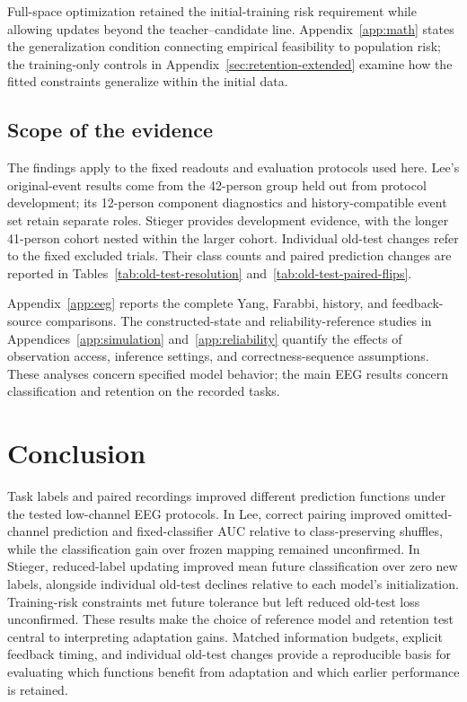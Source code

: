 \documentclass[11pt,a4paper]{article}
\begin{document}
Full-space optimization retained the initial-training risk requirement while allowing updates beyond the teacher--candidate line. Appendix~\ref{app:math} states the generalization condition connecting empirical feasibility to population risk; the training-only controls in Appendix~\ref{sec:retention-extended} examine how the fitted constraints generalize within the initial data.

\subsection{Scope of the evidence}

The findings apply to the fixed readouts and evaluation protocols used here. Lee's original-event results come from the 42-person group held out from protocol development; its 12-person component diagnostics and history-compatible event set retain separate roles. Stieger provides development evidence, with the longer 41-person cohort nested within the larger cohort. Individual old-test changes refer to the fixed excluded trials. Their class counts and paired prediction changes are reported in Tables~\ref{tab:old-test-resolution} and~\ref{tab:old-test-paired-flips}.

Appendix~\ref{app:eeg} reports the complete Yang, Farabbi, history, and feedback-source comparisons. The constructed-state and reliability-reference studies in Appendices~\ref{app:simulation} and~\ref{app:reliability} quantify the effects of observation access, inference settings, and correctness-sequence assumptions. These analyses concern specified model behavior; the main EEG results concern classification and retention on the recorded tasks.

\section{Conclusion}

Task labels and paired recordings improved different prediction functions under the tested low-channel EEG protocols. In Lee, correct pairing improved omitted-channel prediction and fixed-classifier AUC relative to class-preserving shuffles, while the classification gain over frozen mapping remained unconfirmed. In Stieger, reduced-label updating improved mean future classification over zero new labels, alongside individual old-test declines relative to each model's initialization. Training-risk constraints met future tolerance but left reduced old-test loss unconfirmed. These results make the choice of reference model and retention test central to interpreting adaptation gains. Matched information budgets, explicit feedback timing, and individual old-test changes provide a reproducible basis for evaluating which functions benefit from adaptation and which earlier performance is retained.
\end{document}
